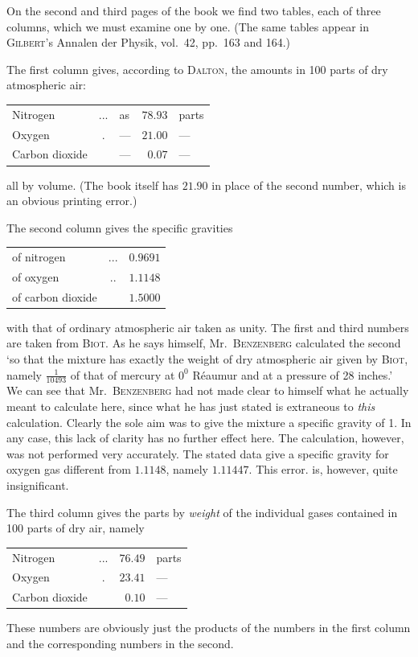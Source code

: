 On the second and third pages of the book we find two tables, each of three columns, which we must examine one by one. (The same tables appear in \textsc{Gilbert}’s Annalen der Physik, vol.\ 42, pp.\ 163 and 164.)

The first column gives, according to \textsc{Dalton}, the amounts in 100 parts of dry atmospheric air:
\begin{center}
\begin{tabular}{lclrl}
Nitrogen & .\quad .\quad . & as & $78.93$ & parts\\
Oxygen & . & — & $21.00$ & —\\
Carbon dioxide & & — & $0.07$ & —
\end{tabular}
\end{center}
all by volume. (The book itself has $21.90$ in place of the second number, which is an obvious printing error.)

The second column gives the specific gravities
\begin{center}
\begin{tabular}{lcr}
of nitrogen & .\quad .\quad . & $0.9691$\\
of oxygen & .\quad . & $1.1148$\\
of carbon dioxide & & $1.5000$
\end{tabular}
\end{center}
with that of ordinary atmospheric air taken as unity. The first and third numbers are taken from \textsc{Biot}. As he says himself, Mr.\ \textsc{Benzenberg} calculated the second ‘so that the mixture has exactly the weight of dry atmospheric air given by \textsc{Biot}, namely $\frac{1}{10493}$ of that of mercury at $0^0$ Réaumur and at a pressure of 28 inches.’ We can see that Mr.\ \textsc{Benzenberg} had not made clear to himself what he actually meant to calculate here, since what he has just stated is extraneous to \textit{this} calculation. Clearly the sole aim was to give
the mixture a specific gravity of 1. In any case, this lack of clarity has no further effect here. The calculation, however, was not performed very accurately. The stated data give a specific gravity for oxygen gas different from $1.1148$, namely $1.11447$. This error. is, however, quite insignificant.

The third column gives the parts by \textit{weight} of the individual gases contained in 100 parts of dry air, namely
\begin{center}\begin{tabular}{lcrl}
Nitrogen & .\quad .\quad . & $76.49$ & parts\\
Oxygen & . & $23.41$ & —\\
Carbon dioxide & & $0.10$ & —
\end{tabular}\end{center}
These numbers are obviously just the products of the numbers in the first column and the corresponding numbers in the second.

